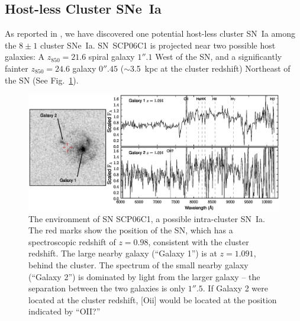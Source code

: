 \subsection{Host-less Cluster SNe~Ia}

As reported in \citet{dawson09a}, we have discovered one potential
host-less cluster SN~Ia among the $8 \pm 1$ cluster SNe~Ia. SN~SCP06C1
is projected near two possible host galaxies: A $z_{850} = 21.6$
spiral galaxy $1''.1$ West of the SN, and a significantly fainter
$z_{850} = 24.6$ galaxy $0''.45$ ($\sim$3.5~kpc at the cluster
redshift) Northeast of the SN (See Fig.~\ref{fig:c1host}).

\begin{figure}[tbh]
\includegraphics[width=\textwidth]{figures/clrate/SCP06C1_host.eps}
\caption[The environment of SN SCP06C1, a possible intra-cluster
  SN~Ia]{The environment of SN SCP06C1, a possible intra-cluster
  SN~Ia. The red marks show the position of the SN, which has a
  spectroscopic redshift of $z=0.98$, consistent with the cluster
  redshift. The large nearby galaxy (``Galaxy 1'') is at $z=1.091$,
  behind the cluster. The spectrum of the small nearby galaxy
  (``Galaxy 2'') is dominated by light from the larger galaxy -- the
  separation between the two galaxies is only $1''.5$. If Galaxy 2
  were located at the cluster redshift, [O{\sc ii}] would be located
  at the position indicated by ``OII?''\label{fig:c1host}}
\end{figure}

